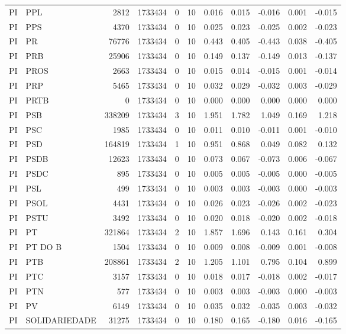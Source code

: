 \begin{landscape}
\begin{longtable}{llrrrrrrrrr}
PI & PPL & 2812 & 1733434 & 0 & 10 & 0.016 & 0.015 & -0.016 & 0.001 & -0.015 \\
PI & PPS & 4370 & 1733434 & 0 & 10 & 0.025 & 0.023 & -0.025 & 0.002 & -0.023 \\
PI & PR & 76776 & 1733434 & 0 & 10 & 0.443 & 0.405 & -0.443 & 0.038 & -0.405 \\
PI & PRB & 25906 & 1733434 & 0 & 10 & 0.149 & 0.137 & -0.149 & 0.013 & -0.137 \\
PI & PROS & 2663 & 1733434 & 0 & 10 & 0.015 & 0.014 & -0.015 & 0.001 & -0.014 \\
PI & PRP & 5465 & 1733434 & 0 & 10 & 0.032 & 0.029 & -0.032 & 0.003 & -0.029 \\
PI & PRTB & 0 & 1733434 & 0 & 10 & 0.000 & 0.000 & 0.000 & 0.000 & 0.000 \\
PI & PSB & 338209 & 1733434 & 3 & 10 & 1.951 & 1.782 & 1.049 & 0.169 & 1.218 \\
PI & PSC & 1985 & 1733434 & 0 & 10 & 0.011 & 0.010 & -0.011 & 0.001 & -0.010 \\
PI & PSD & 164819 & 1733434 & 1 & 10 & 0.951 & 0.868 & 0.049 & 0.082 & 0.132 \\
PI & PSDB & 12623 & 1733434 & 0 & 10 & 0.073 & 0.067 & -0.073 & 0.006 & -0.067 \\
PI & PSDC & 895 & 1733434 & 0 & 10 & 0.005 & 0.005 & -0.005 & 0.000 & -0.005 \\
PI & PSL & 499 & 1733434 & 0 & 10 & 0.003 & 0.003 & -0.003 & 0.000 & -0.003 \\
PI & PSOL & 4431 & 1733434 & 0 & 10 & 0.026 & 0.023 & -0.026 & 0.002 & -0.023 \\
PI & PSTU & 3492 & 1733434 & 0 & 10 & 0.020 & 0.018 & -0.020 & 0.002 & -0.018 \\
PI & PT & 321864 & 1733434 & 2 & 10 & 1.857 & 1.696 & 0.143 & 0.161 & 0.304 \\
PI & PT DO B & 1504 & 1733434 & 0 & 10 & 0.009 & 0.008 & -0.009 & 0.001 & -0.008 \\
PI & PTB & 208861 & 1733434 & 2 & 10 & 1.205 & 1.101 & 0.795 & 0.104 & 0.899 \\
PI & PTC & 3157 & 1733434 & 0 & 10 & 0.018 & 0.017 & -0.018 & 0.002 & -0.017 \\
PI & PTN & 577 & 1733434 & 0 & 10 & 0.003 & 0.003 & -0.003 & 0.000 & -0.003 \\
PI & PV & 6149 & 1733434 & 0 & 10 & 0.035 & 0.032 & -0.035 & 0.003 & -0.032 \\
PI & SOLIDARIEDADE & 31275 & 1733434 & 0 & 10 & 0.180 & 0.165 & -0.180 & 0.016 & -0.165 \\

\end{longtable}
\end{landscape}
